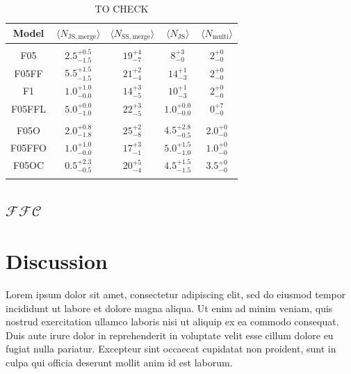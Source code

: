 \documentclass[aa]{lib/aa}
\begin{document}
    \begin{table}
         \caption{TO CHECK}
        \label{Tab:M2Events} 
        \centering 
        \begin{tabular}{c c c c c}
        \hline\hline
        Model & $\langle N_{\mathrm{JS, merge}}\rangle$ & $\langle N_{\mathrm{SS, merge}}\rangle$ & $\langle N_{\mathrm{JS}}\rangle$ &  $\langle N_{\mathrm{multi}} \rangle$ \\
        \hline \vspace{-0.75em}\\ 
           F05     & $2.5^{+0.5}_{-1.5}$ & $19^{+4}_{-7}$ & $8^{+3}_{-0}$  & $2^{+0}_{-0}$ \vspace{0.25em}\\
           F05FF   & $5.5^{+1.5}_{-1.5}$ & $21^{+2}_{-4}$ & $14^{+1}_{-3}$ & $2^{+0}_{-0}$ \vspace{0.25em}\\
           F1      & $1.0^{+1.0}_{-0.0}$ & $14^{+3}_{-5}$ & $10^{+1}_{-3}$ & $2^{+0}_{-0}$ \vspace{0.25em}\\
           F05FFL  & $5.0^{+0.0}_{-1.0}$ & $22^{+3}_{-5}$ & $1.0^{+0.0}_{-0.0}$ & $0^{+7}_{-0}$ \vspace{0.25em}\\
           \hline \vspace{-0.75em}\\
           F05O    & $2.0^{+0.8}_{-1.8}$ & $25^{+2}_{-8}$ & $4.5^{+2.8}_{-0.5}$ & $2.0^{+0}_{-0}$ \vspace{0.25em}\\
           F05FFO  & $1.0^{+1.0}_{-0.0}$ & $17^{+3}_{-1}$ & $5.0^{+1.5}_{-1.0}$ & $1.0^{+0}_{-0}$ \vspace{0.25em}\\
           F05OC   & $0.5^{+2.3}_{-0.5}$ & $20^{+5}_{-4}$ & $4.5^{+1.5}_{-1.5}$ & $3.5^{+0}_{-0}$ \vspace{0.25em}\\
           \hline
         \hline                               %
         \label{Tab:Systems}
        \end{tabular}
     \end{table}
    \subsection{$\mathcal{FFC}$}
    

\section{Discussion}
 Lorem ipsum dolor sit amet, consectetur adipiscing elit, sed do eiusmod tempor incididunt ut labore et dolore magna aliqua. Ut enim ad minim veniam, quis nostrud exercitation ullamco laboris nisi ut aliquip ex ea commodo consequat. Duis aute irure dolor in reprehenderit in voluptate velit esse cillum dolore eu fugiat nulla pariatur. Excepteur sint occaecat cupidatat non proident, sunt in culpa qui officia deserunt mollit anim id est laborum.
\end{document}
